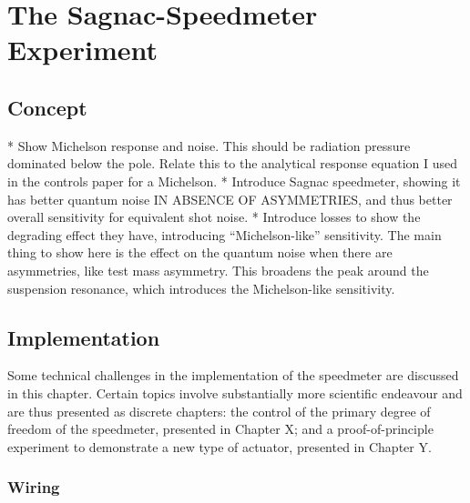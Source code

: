 \chapter{The Sagnac-Speedmeter Experiment}
\label{c:speedmeter-intro}

\section{Concept}
* Show Michelson response and noise. This should be radiation pressure dominated below the pole. Relate this to the analytical response equation I used in the controls paper for a Michelson.
* Introduce Sagnac speedmeter, showing it has better quantum noise IN ABSENCE OF ASYMMETRIES, and thus better overall sensitivity for equivalent shot noise.
* Introduce losses to show the degrading effect they have, introducing ``Michelson-like'' sensitivity. The main thing to show here is the effect on the quantum noise when there are asymmetries, like test mass asymmetry. This broadens the peak around the suspension resonance, which introduces the Michelson-like sensitivity.

\section{Implementation}

Some technical challenges in the implementation of the speedmeter are discussed in this chapter. Certain topics involve substantially more scientific endeavour and are thus presented as discrete chapters: the control of the primary degree of freedom of the speedmeter, presented in Chapter X; and a proof-of-principle experiment to demonstrate a new type of actuator, presented in Chapter Y.

\subsection{Wiring}
